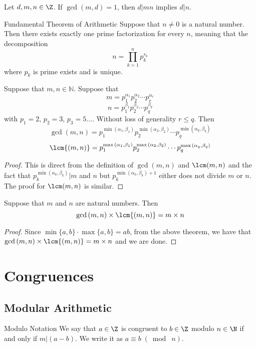 \begin{prp}{}{} Let $d,m,n\in\Z$. If $\gcd(m,d)=1$, then $d|mn$ implies $d|n$. 
\end{prp}

\begin{thm}{Fundamental Theorem of Arithmetic}{} Suppose that $n\neq 0$ is a natural number. Then there exists exactly one prime factorization for every $n$, meaning that the decomposition $$n=\prod_{k=1}^np_k^{s_k}$$ where $p_k$ is prime exists and is unique. 
\end{thm}

\begin{thm}{}{} Suppose that $m,n\in\mathbb{N}$. Suppose that 
$$m=p_1^{\alpha_1}p_2^{\alpha_2}\cdots p_r^{\alpha_r}$$
$$n=p_1^{\beta_1}p_2^{\beta_2}\cdots p_q^{\beta_q}$$
with $p_1=2$, $p_2=3$, $p_3=5\dots$. Without loss of generality $r\leq q$. Then $$\gcd{(m,n)}=p_1^{\min{(\alpha_1,\beta_1)}}p_2^{\min{(\alpha_2,\beta_2)}}\cdots p_q^{\min{(\alpha_q,\beta_q)}}$$
$$\lcm{(m,n)}=p_1^{\max{(\alpha_1,\beta_1)}}p_2^{\max{(\alpha_2,\beta_2)}}\cdots p_q^{\max{(\alpha_q,\beta_q)}}$$ \tcbline
\begin{proof}
This is direct from the definition of $\gcd(m,n)$ and $\lcm(m,n)$ and the fact that $p_k^{\min(\alpha_k,\beta_k)}|m$ and $n$ but $p_k^{\min(\alpha_k,\beta_k)+1}$ either does not divide $m$ or $n$. The proof for $\lcm(m,n)$ is similar. 
\end{proof}
\end{thm}

\begin{thm}{}{} Suppose that $m$ and $n$ are natural numbers. Then $$\gcd{(m,n)}\times\lcm{(m,n)}=m\times n$$ \tcbline
\begin{proof} Since $\min\{a,b\}\cdot\max\{a,b\}=ab$, from the above theorem, we have that $\gcd{(m,n)}\times\lcm{(m,n)}=m\times n$ and we are done. 
\end{proof}
\end{thm}

\pagebreak
\section{Congruences}
\subsection{Modular Arithmetic}
\begin{defn}{Modulo Notation}{} We say that $a\in\Z$ is congruent to $b\in\Z$ modulo $n\in\N$ if and only if $m|(a-b)$. We write it as $a\equiv b\;(\bmod\;n)$. 
\end{defn}

